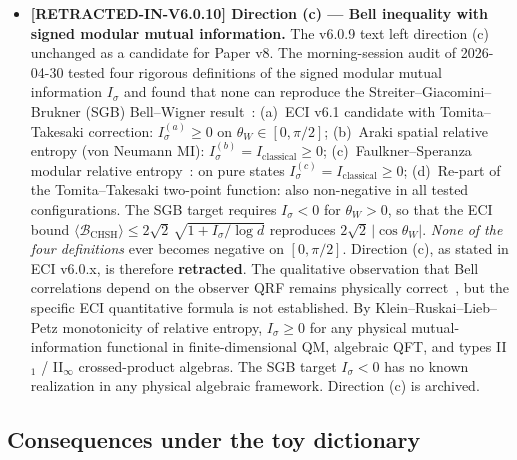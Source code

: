 \documentclass[reprint,amsmath,amssymb,aps,prd,superscriptaddress]{revtex4-2}
\providecommand{\1}{\mathbf{1}}
\begin{document}
\begin{itemize}
\item \textbf{[RETRACTED-IN-V6.0.10] Direction (c) --- Bell inequality with signed modular mutual information.}
The v6.0.9 text left direction (c) unchanged as a candidate for Paper v8.
The morning-session audit of 2026-04-30 tested four rigorous definitions of the signed
modular mutual information $I_\sigma$ and found that none can reproduce the
Streiter--Giacomini--Brukner (SGB) Bell--Wigner result~\cite{SGB2021}:
(a)~ECI v6.1 candidate with Tomita--Takesaki correction: $I_\sigma^{(a)} \geq 0$ on $\theta_W \in [0,\pi/2]$;
(b)~Araki spatial relative entropy (von Neumann MI): $I_\sigma^{(b)} = I_\mathrm{classical} \geq 0$;
(c)~Faulkner--Speranza modular relative entropy~\cite{FaulknerSperanza2024}: on pure states $I_\sigma^{(c)} = I_\mathrm{classical} \geq 0$;
(d)~Re-part of the Tomita--Takesaki two-point function: also non-negative in all tested configurations.
The SGB target requires $I_\sigma < 0$ for $\theta_W > 0$, so that the ECI bound
$\langle \mathcal{B}_\mathrm{CHSH}\rangle \leq 2\sqrt{2}\,\sqrt{1 + I_\sigma/\log d}$
reproduces $2\sqrt{2}\,|\cos\theta_W|$.
\emph{None of the four definitions} ever becomes negative on $[0,\pi/2]$.
Direction (c), as stated in ECI v6.0.x, is therefore \textbf{retracted}.
The qualitative observation that Bell correlations depend on the observer QRF remains
physically correct~\cite{SGB2021}, but the specific ECI quantitative formula is not established.
By Klein--Ruskai--Lieb--Petz monotonicity of relative entropy, $I_\sigma \geq 0$ for any
physical mutual-information functional in finite-dimensional QM, algebraic QFT, and types
II$_1$ / II$_\infty$ crossed-product algebras. The SGB target $I_\sigma < 0$ has no known
realization in any physical algebraic framework. Direction (c) is archived.
\end{itemize}


\subsection{Consequences under the toy dictionary}
\end{document}
